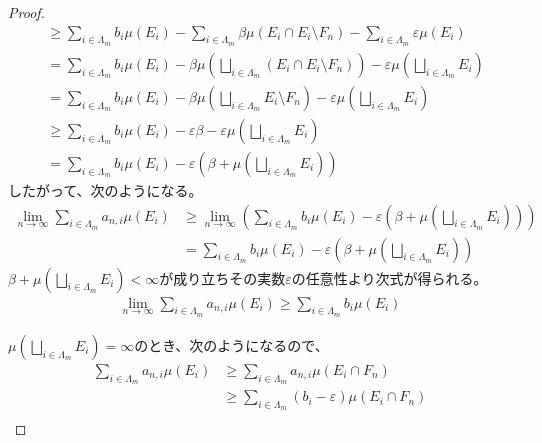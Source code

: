 \documentclass[dvipdfmx]{jsarticle}
\begin{document}
\begin{proof}
\begin{align*}
&\geq \sum_{i \in \varLambda_{m}} {b_{i}\mu\left( E_{i} \right)} - \sum_{i \in \varLambda_{m}} {\beta\mu\left( E_{i} \cap E_{i} \setminus F_{n} \right)} - \sum_{i \in \varLambda_{m}} {\varepsilon\mu\left( E_{i} \right)}\\
&= \sum_{i \in \varLambda_{m}} {b_{i}\mu\left( E_{i} \right)} - \beta\mu\left( \bigsqcup_{i \in \varLambda_{m}} \left( E_{i} \cap E_{i} \setminus F_{n} \right) \right) - \varepsilon\mu\left( \bigsqcup_{i \in \varLambda_{m}} E_{i} \right)\\
&= \sum_{i \in \varLambda_{m}} {b_{i}\mu\left( E_{i} \right)} - \beta\mu\left( \bigsqcup_{i \in \varLambda_{m}} E_{i} \setminus F_{n} \right) - \varepsilon\mu\left( \bigsqcup_{i \in \varLambda_{m}} E_{i} \right)\\
&\geq \sum_{i \in \varLambda_{m}} {b_{i}\mu\left( E_{i} \right)} - \varepsilon\beta - \varepsilon\mu\left( \bigsqcup_{i \in \varLambda_{m}} E_{i} \right)\\
&= \sum_{i \in \varLambda_{m}} {b_{i}\mu\left( E_{i} \right)} - \varepsilon\left( \beta + \mu\left( \bigsqcup_{i \in \varLambda_{m}} E_{i} \right) \right)
\end{align*}
したがって、次のようになる。
\begin{align*}
\lim_{n \rightarrow \infty}{\sum_{i \in \varLambda_{m}} {a_{n,i}\mu\left( E_{i} \right)}} &\geq \lim_{n \rightarrow \infty}\left( \sum_{i \in \varLambda_{m}} {b_{i}\mu\left( E_{i} \right)} - \varepsilon\left( \beta + \mu\left( \bigsqcup_{i \in \varLambda_{m}} E_{i} \right) \right) \right)\\
&= \sum_{i \in \varLambda_{m}} {b_{i}\mu\left( E_{i} \right)} - \varepsilon\left( \beta + \mu\left( \bigsqcup_{i \in \varLambda_{m}} E_{i} \right) \right)
\end{align*}
$\beta + \mu\left( \bigsqcup_{i \in \varLambda_{m}} E_{i} \right) < \infty$が成り立ちその実数$\varepsilon$の任意性より次式が得られる。
\begin{align*}
\lim_{n \rightarrow \infty}{\sum_{i \in \varLambda_{m}} {a_{n,i}\mu\left( E_{i} \right)}} \geq \sum_{i \in \varLambda_{m}} {b_{i}\mu\left( E_{i} \right)}
\end{align*}\par
$\mu\left( \bigsqcup_{i \in \varLambda_{m}} E_{i} \right) = \infty$のとき、次のようになるので、
\begin{align*}
\sum_{i \in \varLambda_{m}} {a_{n,i}\mu\left( E_{i} \right)} &\geq \sum_{i \in \varLambda_{m}} {a_{n,i}\mu\left( E_{i} \cap F_{n} \right)}\\
&\geq \sum_{i \in \varLambda_{m}} {\left( b_{i} - \varepsilon \right)\mu\left( E_{i} \cap F_{n} \right)}\\

\end{align*}
\end{proof}
\end{document}
